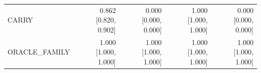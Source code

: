 \begin{table}[t]
\begin{tabular}{lrrrr}
CARRY & \shortstack{0.862\\{[0.820, 0.902]}} & \shortstack{0.000\\{[0.000, 0.000]}} & \shortstack{1.000\\{[1.000, 1.000]}} & \shortstack{0.000\\{[0.000, 0.000]}}\\

ORACLE\_FAMILY & \shortstack{1.000\\{[1.000, 1.000]}} & \shortstack{1.000\\{[1.000, 1.000]}} & \shortstack{1.000\\{[1.000, 1.000]}} & \shortstack{1.000\\{[1.000, 1.000]}}\\

\bottomrule\end{tabular}\end{table}

